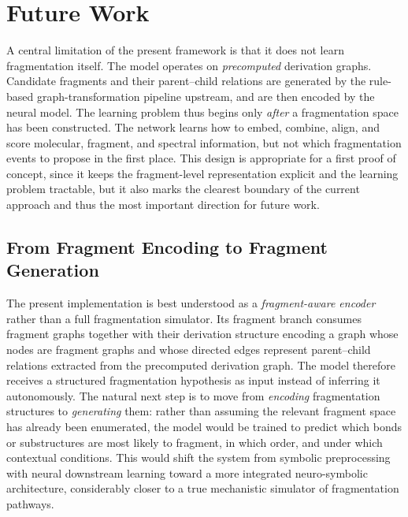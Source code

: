 \chapter{Future Work}
\label{ch:5}
\noindent

A central limitation of the present framework is that it does not learn fragmentation itself.
The model operates on \emph{precomputed} derivation graphs.
Candidate fragments and their parent--child relations are generated by the rule-based graph-transformation pipeline upstream, and are then encoded by the neural model.
The learning problem thus begins only \emph{after} a fragmentation space has been constructed.
The network learns how to embed, combine, align, and score molecular, fragment, and spectral information, but not which fragmentation events to propose in the first place.
This design is appropriate for a first proof of concept, since it keeps the fragment-level representation explicit and the learning problem tractable, but it also marks the clearest boundary of the current approach and thus the most important direction for future work.

\section{From Fragment Encoding to Fragment Generation}
The present implementation is best understood as a \emph{fragment-aware encoder} rather than a full fragmentation simulator.
Its fragment branch consumes fragment graphs together with their derivation structure encoding a graph whose nodes are fragment graphs and whose directed edges represent parent--child relations extracted from the precomputed derivation graph.
The model therefore receives a structured fragmentation hypothesis as input instead of inferring it autonomously.
The natural next step is to move from \emph{encoding} fragmentation structures to \emph{generating} them: rather than assuming the relevant fragment space has already been enumerated, the model would be trained to predict which bonds or substructures are most likely to fragment, in which order, and under which contextual conditions.
This would shift the system from symbolic preprocessing with neural downstream learning toward a more integrated neuro-symbolic architecture, considerably closer to a true mechanistic simulator of fragmentation pathways.


